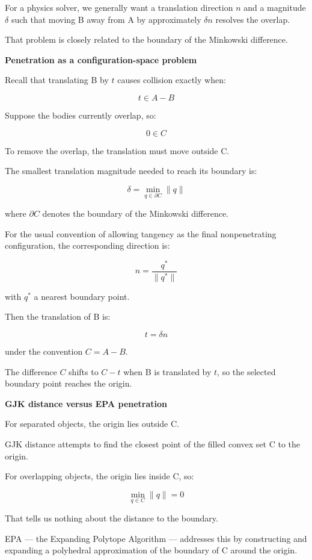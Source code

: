 For a physics solver, we generally want a translation direction \(n\) and a magnitude \(\delta\) such that moving B away from A by approximately \(\delta n\) resolves the overlap.

That problem is closely related to the boundary of the Minkowski difference.

\textbf{Penetration as a configuration-space problem}

Recall that translating B by \(t\) causes collision exactly when:

\[
t\in A-B
\]

Suppose the bodies currently overlap, so:

\[
0\in C
\]

To remove the overlap, the translation must move outside C.

The smallest translation magnitude needed to reach its boundary is:

\[
\boxed{ \delta=\min_{q\in\partial C}\|q\| }
\]

where \(\partial C\) denotes the boundary of the Minkowski difference.

For the usual convention of allowing tangency as the final nonpenetrating configuration, the corresponding direction is:

\[
\boxed{ n=\frac{q^*}{\|q^*\|} }
\]

with \(q^*\) a nearest boundary point.

Then the translation of B is:

\[
\boxed{ t=\delta n }
\]

under the convention \(C=A-B\).

The difference \(C\) shifts to \(C-t\) when B is translated by \(t\), so the selected boundary point reaches the origin.

\textbf{GJK distance versus EPA penetration}

For separated objects, the origin lies outside C.

GJK distance attempts to find the closest point of the filled convex set C to the origin.

For overlapping objects, the origin lies inside C, so:

\[
\min_{q\in C}\|q\|=0
\]

That tells us nothing about the distance to the boundary.

EPA --- the Expanding Polytope Algorithm --- addresses this by constructing and expanding a polyhedral approximation of the boundary of C around the origin.

